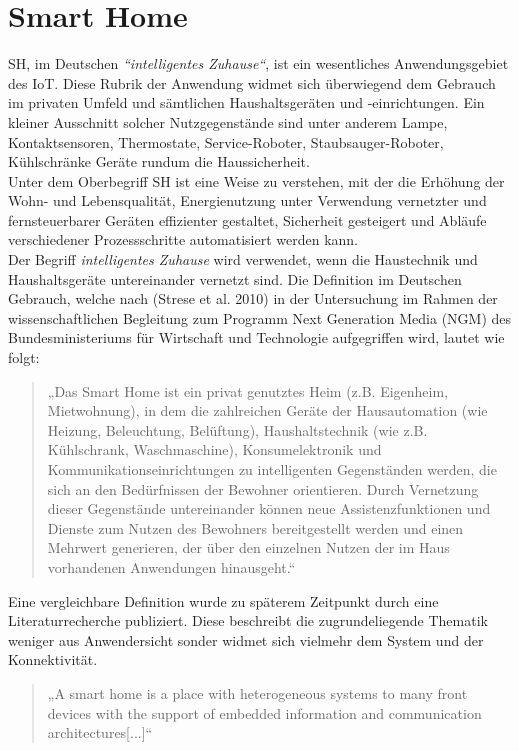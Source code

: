 \section{Smart Home}
\label{sec:smartHome}
    \acl{SH}, im Deutschen \textit{“intelligentes Zuhause“}, ist ein wesentliches Anwendungsgebiet des \acs{IoT}. 
    Diese Rubrik der Anwendung widmet sich überwiegend dem Gebrauch im privaten Umfeld und sämtlichen Haushaltsgeräten 
    und -einrichtungen. Ein kleiner Ausschnitt solcher Nutzgegenstände sind unter anderem Lampe, Kontaktsensoren, 
    Thermostate, Service-Roboter, Staubsauger-Roboter, Kühlschränke Geräte rundum die Haussicherheit. 
    \\ 
    Unter dem Oberbegriff \acl{SH} ist eine Weise zu verstehen, mit der die Erhöhung der Wohn- und Lebensqualität, 
    Energienutzung unter Verwendung vernetzter und fernsteuerbarer Geräten effizienter gestaltet, Sicherheit gesteigert 
    und Abläufe verschiedener Prozessschritte automatisiert werden kann.
    \\ 
    Der Begriff \textit{intelligentes Zuhause} wird verwendet, wenn die Haustechnik und Haushaltsgeräte untereinander 
    vernetzt sind. Die Definition im Deutschen Gebrauch, welche nach (Strese et al. 2010) in der Untersuchung im Rahmen 
    der wissenschaftlichen Begleitung zum Programm Next Generation Media (NGM) des Bundesministeriums für Wirtschaft und 
    Technologie aufgegriffen wird, lautet wie folgt: 
    \begin{quote}
        „Das Smart Home ist ein privat genutztes Heim (z.B. Eigenheim, Mietwohnung), in dem die zahlreichen Geräte der 
        Hausautomation (wie Heizung, Beleuchtung, Belüftung), Haushaltstechnik (wie z.B. Kühlschrank, Waschmaschine), 
        Konsumelektronik und Kommunikationseinrichtungen zu intelligenten Gegenständen werden, die sich an den 
        Bedürfnissen der Bewohner orientieren. Durch Vernetzung dieser Gegenstände untereinander können neue 
        Assistenzfunktionen und Dienste zum Nutzen des Bewohners bereitgestellt werden und einen Mehrwert 
        generieren, der über den einzelnen Nutzen der im Haus vorhandenen Anwendungen hinausgeht.“ \cite{strese.2010m}
    \end{quote}
    Eine vergleichbare Definition wurde zu späterem Zeitpunkt durch eine Literaturrecherche publiziert. Diese beschreibt 
    die zugrundeliegende Thematik weniger aus Anwendersicht sonder widmet sich vielmehr dem System und der Konnektivität. 
    \begin{quote}
        „A smart home is a place with heterogeneous systems to many
        front devices with the support of embedded information and
        communication architectures[...]“ \cite{Balakrishnan2018}
    \end{quote}
